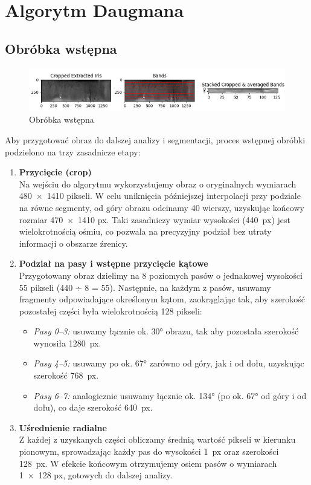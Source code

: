 \documentclass[a4paper]{article}
\begin{document}
\clearpage

\section{Algorytm Daugmana}

\subsection*{Obróbka wstępna}

\begin{figure}[H]
    \centering
    \includegraphics[width=0.9\linewidth]{figures/obrobka wstepna.png}
    \caption{Obróbka wstępna}
\end{figure}

Aby przygotować obraz do dalszej analizy i segmentacji, proces wstępnej obróbki podzielono na trzy zasadnicze etapy:

\begin{enumerate}
  \item \textbf{Przycięcie (crop)}\\
    Na wejściu do algorytmu wykorzystujemy obraz o oryginalnych wymiarach 480 × 1410 pikseli. W celu uniknięcia późniejszej interpolacji przy podziale na równe segmenty, od góry obrazu odcinamy 40 wierszy, uzyskując końcowy rozmiar 470 × 1410 px. Taki zasadniczy wymiar wysokości (440 px) jest wielokrotnością ośmiu, co pozwala na precyzyjny podział bez utraty informacji o obszarze źrenicy.

  \item \textbf{Podział na pasy i wstępne przycięcie kątowe}\\
    Przygotowany obraz dzielimy na 8 poziomych pasów o jednakowej wysokości 55 pikseli (440 ÷ 8 = 55). Następnie, na każdym z pasów, usuwamy fragmenty odpowiadające określonym kątom, zaokrąglając tak, aby szerokość pozostałej części była wielokrotnością 128 pikseli:
    \begin{itemize}
      \item \emph{Pasy 0–3:} usuwamy łącznie ok. 30° obrazu, tak aby pozostała szerokość wynosiła 1280 px.
      \item \emph{Pasy 4–5:} usuwamy po ok. 67° zarówno od góry, jak i od dołu, uzyskując szerokość 768 px.
      \item \emph{Pasy 6–7:} analogicznie usuwamy łącznie ok. 134° (po ok. 67° od góry i od dołu), co daje szerokość 640 px.
    \end{itemize}

  \item \textbf{Uśrednienie radialne}\\
    Z każdej z uzyskanych części obliczamy średnią wartość pikseli w kierunku pionowym, sprowadzając każdy pas do wysokości 1 px oraz szerokości 128 px. W efekcie końcowym otrzymujemy osiem pasów o wymiarach 1 × 128 px, gotowych do dalszej analizy.
\end{enumerate}
\end{document}
